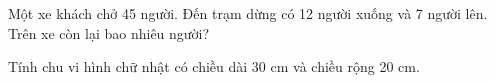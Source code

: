 \begin{ex} %
Một xe khách chở 45 người. Đến trạm dừng có 12 người xuống và 7 người lên. Trên xe còn lại bao nhiêu người?
\end{ex}

\begin{ex} %
Tính chu vi hình chữ nhật có chiều dài 30 cm và chiều rộng 20 cm.
\end{ex}
